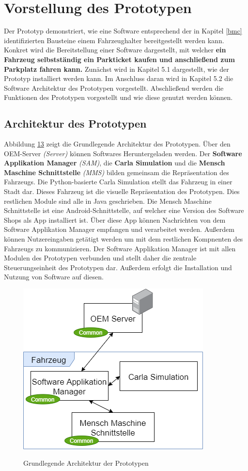 \section{Vorstellung des Prototypen}\label{prototyp}
Der Prototyp demonstriert, wie eine Software entsprechend der in Kapitel \ref{bmc} identifizierten Bausteine einem Fahrzeughalter bereitgestellt werden kann. Konkret wird die Bereitstellung einer Software dargestellt, mit welcher \textbf{ein Fahrzeug selbstständig ein Parkticket kaufen und anschließend zum Parkplatz fahren kann.} Zunächst wird in Kapitel 5.1 dargestellt, wie der Prototyp installiert werden kann. Im Anschluss daran wird in Kapitel 5.2 die Software Architektur des Prototypen vorgestellt. Abschließend werden die Funktionen des Prototypen vorgestellt und wie diese genutzt werden können. 

\subsection{Architektur des Prototypen}	
Abbildung \hyperref[img:basic]{13} zeigt die Grundlegende Architektur des Prototypen. Über den OEM-Server \textit{(Server)} können Softwares Heruntergeladen werden. Der \textbf{Software Applikation Manager} \textit{(SAM)}, die \textbf{Carla Simulation} und die \textbf{Mensch Maschine Schnittstelle} \textit{(MMS)} bilden gemeinsam die Repräsentation des Fahrzeugs. Die Python-basierte Carla Simulation stellt das Fahrzeug in einer Stadt dar. Dieses Fahrzeug ist die visuelle Repräsentation des Prototypen. Dies restlichen Module sind alle in Java geschrieben. Die Mensch Maschine Schnittstelle ist eine Android-Schnittstelle, auf welcher eine Version des Software Shops als App installiert ist. Über diese App können Nachrichten von dem Software Applikation Manager empfangen und verarbeitet werden. Außerdem können Nutzereingaben getätigt werden um mit dem restlichen Kompnenten des Fahrzeugs zu kommunizieren. Der Software Applikation Manager ist mit allen Modulen des Prototypen verbunden und stellt daher die zentrale Steuerungseinheit des Prototypen dar. Außerdem erfolgt die Installation und Nutzung von Software auf diesen.
\begin{figure}[!h]
	\centering
	\includegraphics[width=0.5\columnwidth]{pictures/konzept-basic.png}
	\label{img:basic}
	\caption{Grundlegende Architektur der Prototypen}
\end{figure}

